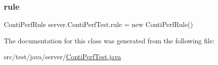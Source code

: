 \subsubsection{\texorpdfstring{rule}{rule}}
{\footnotesize\ttfamily Conti\+Perf\+Rule server.\+Conti\+Perf\+Test.\+rule = new Conti\+Perf\+Rule()}



The documentation for this class was generated from the following file\+:\begin{DoxyCompactItemize}
\item 
src/test/java/server/\hyperlink{_conti_perf_test_8java}{Conti\+Perf\+Test.\+java}\end{DoxyCompactItemize}
